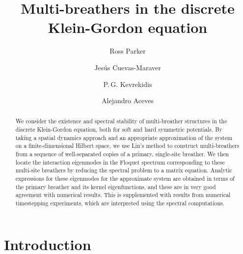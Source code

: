 \documentclass[12pt,reqno]{amsart}
\theoremstyle{definition}
\begin{document}
\title{Multi-breathers in the discrete Klein-Gordon equation}

\author{Ross Parker}
\address{Department of Mathematics, Southern Methodist University, 
Dallas, TX 75275, USA}

\author{Jes\'us Cuevas-Maraver}
\address{Grupo de F\'{\i}sica No Lineal, Departamento de F\'{\i}sica Aplicada I,
Universidad de Sevilla. Escuela Polit\'{e}cnica Superior, C/ Virgen de Africa, 7, 41011-Sevilla, Spain}
\address{Instituto de Matem\'{a}ticas de la Universidad de Sevilla (IMUS). Edificio
Celestino Mutis. Avda. Reina Mercedes s/n, 41012-Sevilla, Spain, Avda Reina Mercedes s/n, E-41012 Sevilla, Spain}

\author{P.\,G. Kevrekidis} 
\address{Department of Mathematics and Statistics, University of Massachusetts, Amherst MA 01003, USA}

\author{Alejandro Aceves}
\address{Department of Mathematics, Southern Methodist University, 
Dallas, TX 75275, USA}

\begin{abstract}
	We consider the existence and spectral stability of multi-breather structures in the discrete Klein-Gordon equation, both for soft and hard symmetric potentials. By taking a spatial dynamics approach and an appropriate approximation of the system on a finite-dimensional Hilbert space, we use Lin's method to construct multi-breathers from a sequence of well-separated copies of a primary, single-site breather. We then locate the interaction eigenmodes in the Floquet spectrum corresponding to these multi-site breathers by reducing the spectral problem to a matrix equation. Analytic expressions for these eigenmodes for the approximate system are obtained in terms of the primary breather and its kernel eigenfunctions, and these are in very good agreement with numerical results. This is supplemented with results from numerical timestepping experiments, which are interpreted using the spectral computations.
\end{abstract}

\maketitle

\section{Introduction}
\end{document}
